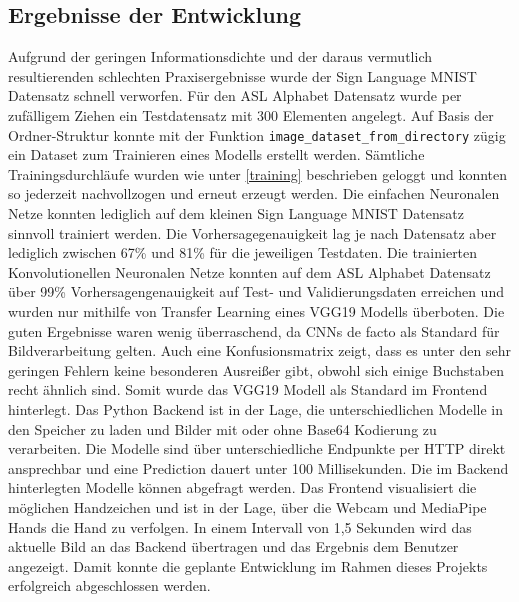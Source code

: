 \documentclass[11pt,bibliography=totocnumbered]{scrartcl}
\begin{document}
\subsection{Ergebnisse der Entwicklung}
Aufgrund der geringen Informationsdichte und der daraus vermutlich resultierenden schlechten Praxisergebnisse wurde der Sign Language MNIST Datensatz schnell verworfen. Für den ASL Alphabet Datensatz wurde per zufälligem Ziehen ein Testdatensatz mit 300 Elementen angelegt. Auf Basis der Ordner-Struktur konnte mit der Funktion \lstinline[language=pythoninline]|image_dataset_from_directory| zügig ein Dataset zum Trainieren eines Modells erstellt werden. Sämtliche Trainingsdurchläufe wurden wie unter \ref{training} beschrieben geloggt und konnten so jederzeit nachvollzogen und erneut erzeugt werden. Die einfachen Neuronalen Netze konnten lediglich auf dem kleinen Sign Language MNIST Datensatz sinnvoll trainiert werden. Die Vorhersagegenauigkeit lag je nach Datensatz aber lediglich zwischen 67\% und 81\% für die jeweiligen Testdaten. Die trainierten Konvolutionellen Neuronalen Netze konnten auf dem ASL Alphabet Datensatz über 99\% Vorhersagengenauigkeit auf Test- und Validierungsdaten erreichen und wurden nur mithilfe von Transfer Learning eines VGG19 Modells überboten. Die guten Ergebnisse waren wenig überraschend, da CNNs de facto als Standard für Bildverarbeitung gelten. Auch eine Konfusionsmatrix zeigt, dass es unter den sehr geringen Fehlern keine besonderen Ausreißer gibt, obwohl sich einige Buchstaben recht ähnlich sind. Somit wurde das VGG19 Modell als Standard im Frontend hinterlegt. Das Python Backend ist in der Lage, die unterschiedlichen Modelle in den Speicher zu laden und Bilder mit oder ohne Base64 Kodierung zu verarbeiten. Die Modelle sind über unterschiedliche Endpunkte per HTTP direkt ansprechbar und eine Prediction dauert unter 100 Millisekunden. Die im Backend hinterlegten Modelle können abgefragt werden.  Das Frontend visualisiert die möglichen Handzeichen und ist in der Lage, über die Webcam und MediaPipe Hands die Hand zu verfolgen. In einem Intervall von 1,5 Sekunden wird das aktuelle Bild an das Backend übertragen und das Ergebnis dem Benutzer angezeigt. Damit konnte die geplante Entwicklung im Rahmen dieses Projekts erfolgreich abgeschlossen werden.
\end{document}
